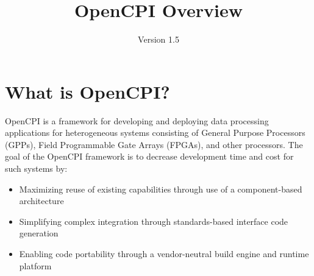 \def\docTitle{OpenCPI Overview}
\def\docVersion{1.5}

\setlength{\parindent}{0pt} %
\newcommand{\forceindent}{\leavevmode{\parindent=1em\indent}}
\date{Version \docVersion} %
\title{\docTitle}
\lhead{\small {\docTitle} }
\def\bstart{~\\
\begin{minipage}{\linewidth}}
\def\bend{\end{minipage}
~\\
}

\section*{What is OpenCPI?}
\label{sec:what_is_opencpi}
OpenCPI is a framework for developing and deploying data processing applications for heterogeneous systems consisting of General Purpose Processors (GPPs), Field Programmable Gate Arrays (FPGAs), and other processors. The goal of the OpenCPI framework is to decrease development time and cost for such systems by:
\begin{itemize}
\item Maximizing reuse of existing capabilities through use of a component-based architecture
\item Simplifying complex integration through standards-based interface code generation
\item Enabling code portability through a vendor-neutral build engine and runtime platform
\end{itemize}


